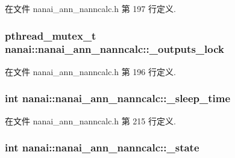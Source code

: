 在文件 nanai\+\_\+ann\+\_\+nanncalc.\+h 第 197 行定义.

\hypertarget{classnanai_1_1nanai__ann__nanncalc_a1c9006356f22904fee12c3635cdc8a15}{}
\subsubsection[{\+\_\+outputs\+\_\+lock}]{\setlength{\rightskip}{0pt plus 5cm}pthread\+\_\+mutex\+\_\+t nanai\+::nanai\+\_\+ann\+\_\+nanncalc\+::\+\_\+outputs\+\_\+lock\hspace{0.3cm}{\ttfamily [protected]}}\label{classnanai_1_1nanai__ann__nanncalc_a1c9006356f22904fee12c3635cdc8a15}


在文件 nanai\+\_\+ann\+\_\+nanncalc.\+h 第 196 行定义.

\hypertarget{classnanai_1_1nanai__ann__nanncalc_ad5c0182fd45d65dd7d91439d4eec6119}{}
\subsubsection[{\+\_\+sleep\+\_\+time}]{\setlength{\rightskip}{0pt plus 5cm}int nanai\+::nanai\+\_\+ann\+\_\+nanncalc\+::\+\_\+sleep\+\_\+time\hspace{0.3cm}{\ttfamily [protected]}}\label{classnanai_1_1nanai__ann__nanncalc_ad5c0182fd45d65dd7d91439d4eec6119}


在文件 nanai\+\_\+ann\+\_\+nanncalc.\+h 第 215 行定义.

\hypertarget{classnanai_1_1nanai__ann__nanncalc_a1b2991833f76b5400e371f01ad7c6bbc}{}
\subsubsection[{\+\_\+state}]{\setlength{\rightskip}{0pt plus 5cm}int nanai\+::nanai\+\_\+ann\+\_\+nanncalc\+::\+\_\+state\hspace{0.3cm}{\ttfamily [protected]}}\label{classnanai_1_1nanai__ann__nanncalc_a1b2991833f76b5400e371f01ad7c6bbc}


